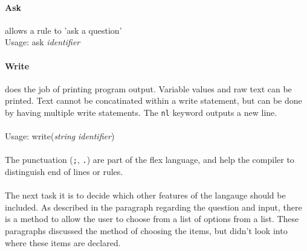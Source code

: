 \documentclass[12pt]{report}
\begin{document}
\paragraph{Ask} allows a rule to 'ask a question'\\
Usage: ask \textit{identifier}\\
\paragraph{Write} does the job of printing program output.  Variable values and raw text can be printed.  Text cannot be concatinated within a write statement, but can be done by having multiple write statements.  The \texttt{nl} keyword outputs a new line.\\
\\
Usage: write(\textit{string} \textbar \space \textit{identifier})\\
\\
The punctuation (\texttt{;}, \texttt{.}) are part of the flex language, and help the compiler to distinguish end of lines or rules.\\
\\
The next task it is to decide which other features of the langauge should be included.  As described in the paragraph regarding the question and input, there is a method to allow the user to choose from a list of options from a list.  These paragraphs discussed the method of choosing the items, but didn't look into where these items are declared.
\end{document}
